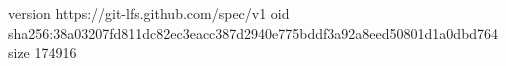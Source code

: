 version https://git-lfs.github.com/spec/v1
oid sha256:38a03207fd811dc82ec3eacc387d2940e775bddf3a92a8eed50801d1a0dbd764
size 174916
